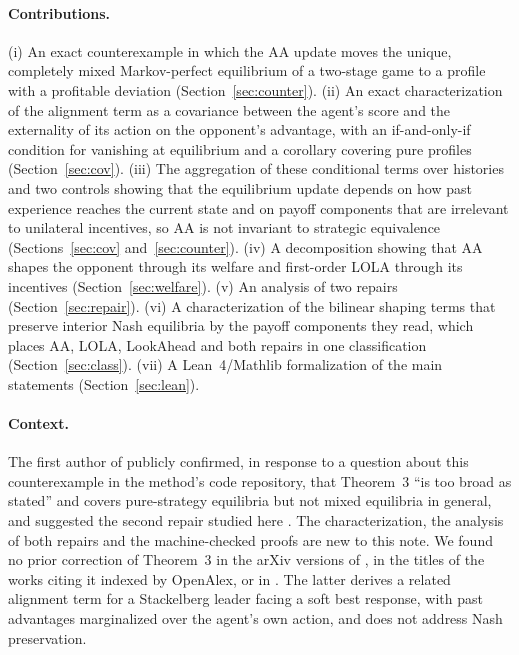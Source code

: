 \documentclass[11pt]{article}
\theoremstyle{remark}
\begin{document}
\paragraph{Contributions.}
(i) An exact counterexample in which the AA update moves the unique, completely mixed Markov-perfect equilibrium of a two-stage game to a profile with a profitable deviation (Section~\ref{sec:counter}). (ii) An exact characterization of the alignment term as a covariance between the agent's score and the externality of its action on the opponent's advantage, with an if-and-only-if condition for vanishing at equilibrium and a corollary covering pure profiles (Section~\ref{sec:cov}). (iii) The aggregation of these conditional terms over histories and two controls showing that the equilibrium update depends on how past experience reaches the current state and on payoff components that are irrelevant to unilateral incentives, so AA is not invariant to strategic equivalence (Sections~\ref{sec:cov} and~\ref{sec:counter}). (iv) A decomposition showing that AA shapes the opponent through its welfare and first-order LOLA through its incentives (Section~\ref{sec:welfare}). (v) An analysis of two repairs (Section~\ref{sec:repair}). (vi) A characterization of the bilinear shaping terms that preserve interior Nash equilibria by the payoff components they read, which places AA, LOLA, LookAhead and both repairs in one classification (Section~\ref{sec:class}). (vii) A Lean~4/Mathlib formalization of the main statements (Section~\ref{sec:lean}).

\paragraph{Context.} The first author of \citet{duque2025aa} publicly confirmed, in response to a question about this counterexample in the method's code repository, that Theorem~3 ``is too broad as stated'' and covers pure-strategy equilibria but not mixed equilibria in general, and suggested the second repair studied here \citep{duque2026issue}. The characterization, the analysis of both repairs and the machine-checked proofs are new to this note. We found no prior correction of Theorem~3 in the arXiv versions of \citet{duque2025aa}, in the titles of the works citing it indexed by OpenAlex, or in \citet{piche2026thesis}. The latter derives a related alignment term for a Stackelberg leader facing a soft best response, with past advantages marginalized over the agent's own action, and does not address Nash preservation.
\end{document}

